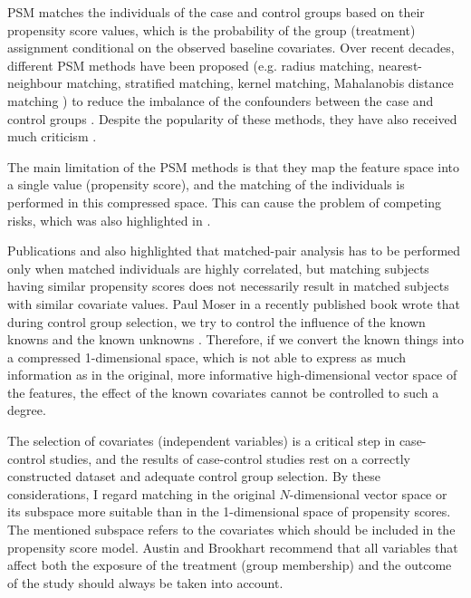 PSM matches the individuals of the case and control groups based on their propensity score values, which is the probability of the group (treatment) assignment conditional on the observed baseline covariates. Over recent decades, different PSM methods have been proposed (e.g. radius matching, nearest-neighbour matching, stratified matching, kernel matching, Mahalanobis distance matching \cite{baser2006too, austin2011introduction, caliendo2008some}) to reduce the imbalance of the confounders between the case and control groups \cite{stuart2010matching}. Despite the popularity of these methods, they have also received much criticism \cite{biondi2011propensity, pearl2009remarks, mansournia2018case}.


The main limitation of the PSM methods is that they map the feature space into a single value (propensity score), and the matching of the individuals is performed in this compressed space. This can cause the problem of competing risks, which was also highlighted in \cite{he2021optimal}.

Publications \cite{stuart2010matching} and \cite{wan2019matched} also highlighted that matched-pair analysis has to be performed only when matched individuals are highly correlated, but matching subjects having similar propensity scores does not necessarily result in matched subjects with similar covariate values. Paul Moser in a recently published book wrote that during control group selection, we try to control the influence of the known knowns and the known unknowns \cite{moser2019out}. Therefore, if we convert the known things into a compressed 1-dimensional space, which is not able to express as much information as in the original, more informative high-dimensional vector space of the features, the effect of the known covariates cannot be controlled to such a degree.

The selection of covariates (independent variables) is a critical step in case-control studies, and the results of case-control studies rest on a correctly constructed dataset and adequate control group selection. By these considerations, I regard matching in the original $N$-dimensional vector space or its subspace more suitable than in the 1-dimensional space of propensity scores. The mentioned subspace refers to the covariates which should be included in the propensity score model. Austin \cite{austin2007comparison} and Brookhart \cite{brookhart2006variable} recommend that all variables that affect both the exposure of the treatment (group membership) and the outcome of the study should always be taken into account.

